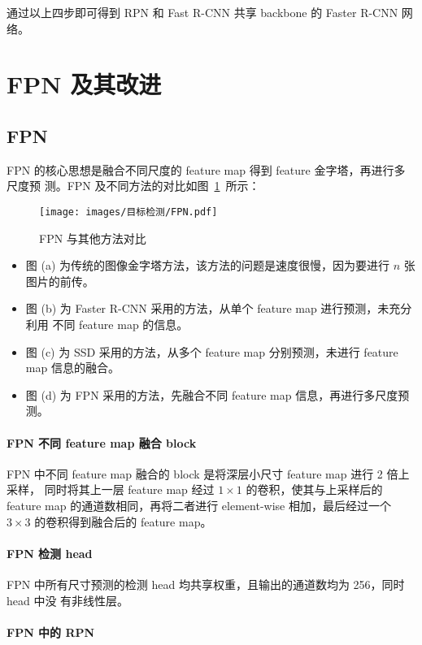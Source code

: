 通过以上四步即可得到 RPN 和 Fast R-CNN 共享 backbone 的 Faster R-CNN 网络。

\section{FPN 及其改进}\label{sec:FPN}

\subsection{FPN}\label{subsec:FPN}
FPN 的核心思想是融合不同尺度的 feature map 得到 feature 金字塔，再进行多尺度预
测。FPN 及不同方法的对比如图~\ref{fig:FPN}~所示：

\begin{figure}[ht]
  \centering
  \texttt{[image: images/目标检测/FPN.pdf]}
  \caption{FPN 与其他方法对比}\label{fig:FPN}
\end{figure}

\begin{itemize}
  \item 图 (a) 为传统的图像金字塔方法，该方法的问题是速度很慢，因为要进行 $n$ 张
    图片的前传。
  \item 图 (b) 为 Faster R-CNN 采用的方法，从单个 feature map 进行预测，未充分利用
    不同 feature map 的信息。
  \item 图 (c) 为 SSD 采用的方法，从多个 feature map 分别预测，未进行 feature map
    信息的融合。
  \item 图 (d) 为 FPN 采用的方法，先融合不同 feature map 信息，再进行多尺度预测。
\end{itemize}

\paragraph{FPN 不同 feature map 融合 block}
FPN 中不同 feature map 融合的 block 是将深层小尺寸 feature map 进行 2 倍上采样，
同时将其上一层 feature map 经过 $1 \times 1$ 的卷积，使其与上采样后的 feature
map 的通道数相同，再将二者进行 element-wise 相加，最后经过一个 $3 \times 3$
的卷积得到融合后的 feature map。

\paragraph{FPN 检测 head}
FPN 中所有尺寸预测的检测 head 均共享权重，且输出的通道数均为 256，同时 head 中没
有非线性层。

\paragraph{FPN 中的 RPN}


